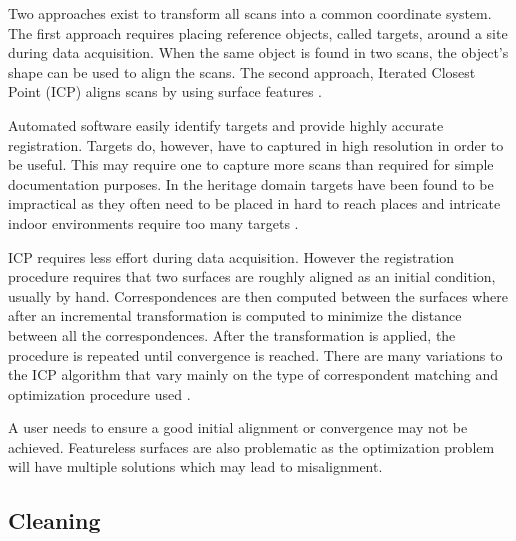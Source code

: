 Two approaches exist to transform all scans into a common coordinate system. The first approach requires placing reference objects, called targets, around a site during data acquisition. When the same object is found in two scans, the object's shape can be used to align the scans. The second approach, Iterated Closest Point (ICP) aligns scans by using surface features \cite{Besl1992}.

Automated software easily identify targets and provide highly accurate registration. Targets do, however, have to captured in high resolution in order to be useful. This may require one to capture more scans than required for simple documentation purposes. In the heritage domain targets have been found to be impractical as they often need to be placed in hard to reach places and intricate indoor environments require too many targets \cite{Ruther2011}. 

ICP requires less effort during data acquisition. However the registration procedure requires that two surfaces are roughly aligned as an initial condition, usually by hand. Correspondences are then computed between the surfaces where after an incremental transformation is computed to minimize the distance between all the correspondences. After the transformation is applied, the procedure is repeated until convergence is reached. There are many variations to the ICP algorithm that vary mainly on the type of correspondent matching and optimization procedure used \cite{Besl1992}.  

A user needs to ensure a good initial alignment or convergence may not be achieved. Featureless surfaces are also problematic as the optimization problem will have multiple solutions which may lead to misalignment.

\subsection{Cleaning}\label{sec:cleaning}

